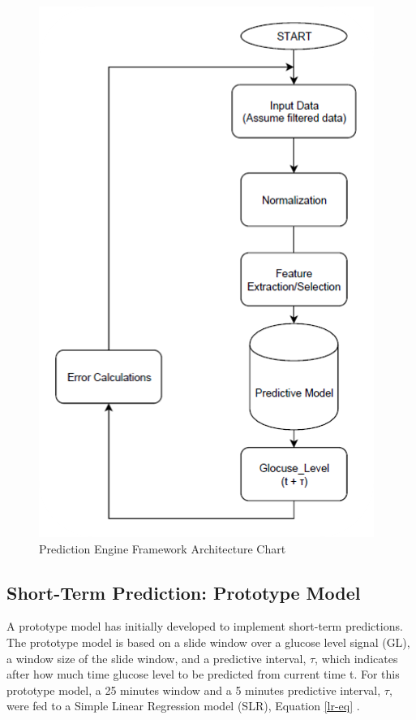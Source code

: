 \begin{center}
\begin{figure}[ht!]
	\centering
    \includegraphics[scale=0.7]{Figures/mo/arc.png}
 	\caption{Prediction Engine Framework Architecture Chart}
  	\label{arc}
\end{figure}
\end{center}

\pagebreak

\subsection{Short-Term Prediction: Prototype Model}
A prototype model has initially developed to implement short-term predictions. The prototype model is based on a slide window over a glucose level signal (GL), a window size of the slide window, and a predictive interval, \ensuremath{\tau}, which indicates after how much time glucose level to be predicted from current time t. For this prototype model, a 25 minutes window and a 5 minutes predictive interval, \ensuremath{\tau}, were fed to a Simple Linear Regression model (SLR), Equation \ref{lr-eq} . 

